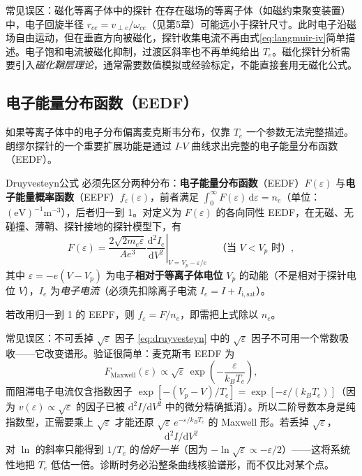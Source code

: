 \documentclass[12pt,a4paper,openany,oneside]{book}
\newcommand{\diff}{\mathrm{d}}
\newcommand{\eps}{\varepsilon}
\begin{document}
\begin{warning}{常见误区：磁化等离子体中的探针}{}
在存在磁场的等离子体（如磁约束聚变装置）中，电子回旋半径 $r_{ce} = v_{\perp e}/\omega_{ce}$（见第5章）可能远小于探针尺寸。此时电子沿磁场自由运动，但在垂直方向被磁化，探针收集电流不再由式\eqref{eq:langmuir-iv}简单描述。电子饱和电流被磁化抑制，过渡区斜率也不再单纯给出 $T_e$。磁化探针分析需要引入\emph{磁化鞘层理论}，通常需要数值模拟或经验标定，不能直接套用无磁化公式。
\end{warning}

\subsection{电子能量分布函数（EEDF）}

如果等离子体中的电子分布偏离麦克斯韦分布，仅靠 $T_e$ 一个参数无法完整描述。朗缪尔探针的一个重要扩展功能是通过 $I$-$V$ 曲线求出完整的电子能量分布函数（EEDF）。

\begin{theorem}{Druyvesteyn公式}{}{}
必须先区分两种分布：\textbf{电子能量分布函数}（EEDF）$F(\eps)$ 与\textbf{电子能量概率函数}（EEPF）$f_\eps(\eps)$，前者满足 $\int_0^\infty F(\eps)\,\diff\eps = n_e$（单位：$(\mathrm{eV})^{-1}\mathrm{m}^{-3}$），后者归一到 1。对定义为 $F(\eps)$ 的各向同性 EEDF，在无磁、无碰撞、薄鞘、探针接地的探针模型下，有
\begin{equation}
F(\eps) = \frac{2\sqrt{2 m_e \eps}}{A e^3}
\left.\frac{\diff^2 I_e}{\diff V^2}\right|_{V = V_p - \eps/e}
\quad \text{（当 } V < V_p \text{ 时）},
\label{eq:druyvesteyn}
\end{equation}
其中 $\eps = -e(V - V_p)$ 为电子\textbf{相对于等离子体电位} $V_p$ 的动能（不是相对于探针电位 $V$），$I_e$ 为\emph{电子电流}（必须先扣除离子电流 $I_e = I + I_{\mathrm{i,sat}}$）。

若改用归一到 1 的 EEPF，则 $f_\eps = F/n_e$，即需把上式除以 $n_e$。
\end{theorem}

\begin{warning}{常见误区：不可丢掉 $\sqrt{\eps}$ 因子}{}
\eqref{eq:druyvesteyn} 中的 $\sqrt{\eps}$ 因子不可用一个常数吸收——它改变谱形。验证很简单：麦克斯韦 EEDF 为
\[
F_{\mathrm{Maxwell}}(\eps) \propto \sqrt{\eps}\,\exp\!\left(-\frac{\eps}{k_BT_e}\right),
\]
而阻滞电子电流仅含指数因子 $\exp[-(V_p-V)/T_e] = \exp[-\eps/(k_BT_e)]$（因为 $v(\eps)\propto\sqrt{\eps}$ 的因子已被 $\diff^2 I/\diff V^2$ 中的微分精确抵消）。所以二阶导数本身是纯指数型，正需要乘上 $\sqrt{\eps}$ 才能还原 $\sqrt{\eps}\,e^{-\eps/k_BT_e}$ 的 Maxwell 形。若丢掉 $\sqrt{\eps}$，$$\diff^2I/\diff V^2$$ 对 $\ln$ 的斜率只能得到 $1/T_e$ 的\emph{恰好一半}（因为 $-\ln\sqrt\eps \propto -\eps/2$）——这将系统性地把 $T_e$ 低估一倍。诊断时务必沿整条曲线核验谱形，而不仅比对某个点。
\end{warning}
\end{document}
